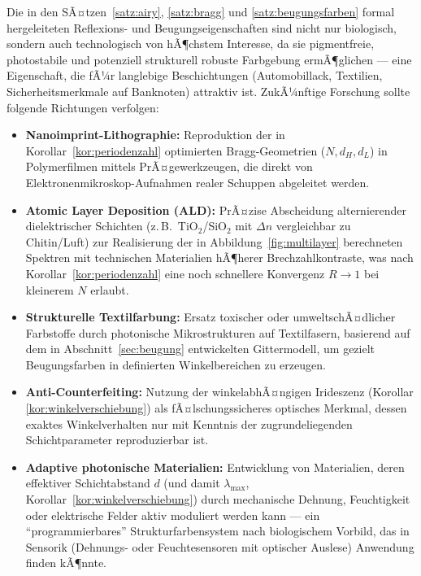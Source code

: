 ﻿\documentclass[a4paper,12pt]{article}
\theoremstyle{definition}
\begin{document}
	Die in den SÃ¤tzen~\ref{satz:airy}, \ref{satz:bragg} und
	\ref{satz:beugungsfarben} formal hergeleiteten Reflexions- und
	Beugungseigenschaften sind nicht nur biologisch, sondern auch
	technologisch von hÃ¶chstem Interesse, da sie pigmentfreie,
	photostabile und potenziell strukturell robuste Farbgebung
	ermÃ¶glichen --- eine Eigenschaft, die fÃ¼r langlebige Beschichtungen
	(Automobillack, Textilien, Sicherheitsmerkmale auf Banknoten) attraktiv
	ist. ZukÃ¼nftige Forschung sollte folgende Richtungen verfolgen:
	\begin{itemize}
		\item \textbf{Nanoimprint-Lithographie:} Reproduktion der in
		Korollar~\ref{kor:periodenzahl} optimierten Bragg-Geometrien
		($N,d_H,d_L$) in Polymerfilmen mittels PrÃ¤gewerkzeugen, die direkt
		von Elektronenmikroskop-Aufnahmen realer Schuppen abgeleitet
		werden.
		\item \textbf{Atomic Layer Deposition (ALD):} PrÃ¤zise Abscheidung
		alternierender dielektrischer Schichten (z.\,B.\
		TiO$_2$/SiO$_2$ mit $\Delta n$ vergleichbar zu Chitin/Luft) zur
		Realisierung der in Abbildung~\ref{fig:multilayer} berechneten
		Spektren mit technischen Materialien hÃ¶herer Brechzahlkontraste,
		was nach Korollar~\ref{kor:periodenzahl} eine noch schnellere
		Konvergenz $R\to1$ bei kleinerem $N$ erlaubt.
		\item \textbf{Strukturelle Textilfarbung:} Ersatz toxischer oder
		umweltschÃ¤dlicher Farbstoffe durch photonische Mikrostrukturen auf
		Textilfasern, basierend auf dem in
		Abschnitt~\ref{sec:beugung} entwickelten Gittermodell, um
		gezielt Beugungsfarben in definierten Winkelbereichen zu erzeugen.
		\item \textbf{Anti-Counterfeiting:} Nutzung der
		winkelabhÃ¤ngigen Irideszenz (Korollar
		\ref{kor:winkelverschiebung}) als fÃ¤lschungssicheres optisches
		Merkmal, dessen exaktes Winkelverhalten nur mit Kenntnis der
		zugrundeliegenden Schichtparameter reproduzierbar ist.
		\item \textbf{Adaptive photonische Materialien:} Entwicklung von
		Materialien, deren effektiver Schichtabstand $d$ (und damit
		$\lambda_{\max}$, Korollar~\ref{kor:winkelverschiebung}) durch
		mechanische Dehnung, Feuchtigkeit oder elektrische Felder aktiv
		moduliert werden kann --- ein ``programmierbares'' Strukturfarben\-system
		nach biologischem Vorbild, das in Sensorik (Dehnungs- oder
		Feuchtesensoren mit optischer Auslese) Anwendung finden kÃ¶nnte.
	\end{itemize}
\end{document}

